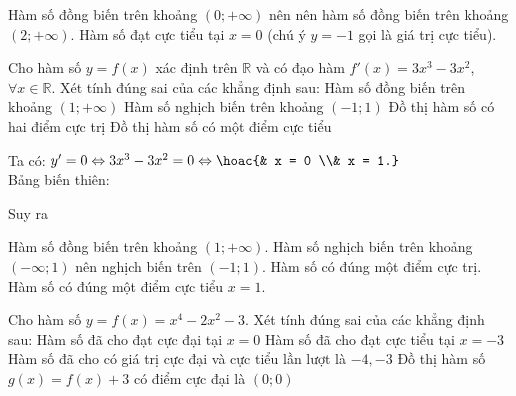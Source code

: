 \begin{ex}
\begin{ex}
{\begin{itemchoice}
 \itemch Hàm số đồng biến trên khoảng $(0;+\infty)$ nên nên hàm số đồng biến trên khoảng $(2;+\infty)$.
 \itemch Hàm số đạt cực tiểu tại $x=0$ (chú ý $y=-1$ gọi là giá trị cực tiểu).
 \end{itemchoice}
 }
\end{ex}
\begin{ex}
 Cho hàm số $y = f(x)$ xác định trên $\mathbb{R}$ và có đạo hàm $f'(x) = 3x^3 - 3x^2$, $\forall x\in \mathbb{R}$. Xét tính đúng sai của các khẳng định sau:
 \choiceTF
 {\True Hàm số đồng biến trên khoảng $(1;+\infty)$}
 {\True Hàm số nghịch biến trên khoảng $(-1;1)$}
 {Đồ thị hàm số có hai điểm cực trị}
 {\True Đồ thị hàm số có một điểm cực tiểu}
 \loigiai
 {
 Ta có: $y' = 0 \Leftrightarrow 3x^3 - 3x^2 = 0 \Leftrightarrow \hoac{& x = 0 \\& x = 1.}$\\
 Bảng biến thiên:
 \begin{center}
 \end{center}
 Suy ra
 \begin{itemchoice}
 \itemch Hàm số đồng biến trên khoảng $(1;+\infty)$.
 \itemch Hàm số nghịch biến trên khoảng $(-\infty;1)$ nên nghịch biến trên $(-1;1)$.
 \itemch Hàm số có đúng một điểm cực trị.
 \itemch Hàm số có đúng một điểm cực tiểu $x = 1$.
 \end{itemchoice}
 }
\end{ex}
\begin{ex}%
 Cho hàm số $y=f(x)=x^4-2x^2-3$. Xét tính đúng sai của các khẳng định sau:
 \choiceTF
 {\True Hàm số đã cho đạt cực đại tại $x=0$}
 {Hàm số đã cho đạt cực tiểu tại $x=-3$}
 {Hàm số đã cho có giá trị cực đại và cực tiểu lần lượt là $-4,-3$}
 {Đồ thị hàm số $g(x)=f(x)+3$ có điểm cực đại là $(0;0)$ }
\end{ex}
\end{ex}
